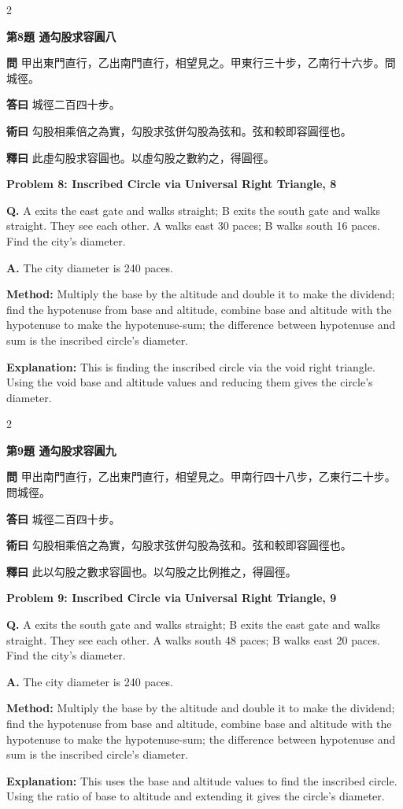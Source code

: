 \documentclass[11pt,a4paper]{article}
\newcommand{\wen}[1]{\noindent\textbf{問} #1\par\smallskip}
\newcommand{\da}[1]{\noindent\textbf{答曰} #1\par\smallskip}
\newcommand{\shu}[1]{\noindent\textbf{術曰} #1\par\smallskip}
\newcommand{\shi}[1]{\noindent\textbf{釋曰} #1\par\smallskip}
\newcommand{\wenE}[1]{\noindent\textbf{Q.} #1\par\smallskip}
\newcommand{\daE}[1]{\noindent\textbf{A.} #1\par\smallskip}
\newcommand{\shuE}[1]{\noindent\textbf{Method:} #1\par\smallskip}
\newcommand{\shiE}[1]{\noindent\textbf{Explanation:} #1\par\smallskip}
\begin{document}
\bigskip

\begin{paracol}{2}

\noindent\textbf{第8題 通勾股求容圓八}

\wen{甲出東門直行，乙出南門直行，相望見之。甲東行三十步，乙南行十六步。問城徑。}
\da{城徑二百四十步。}
\shu{勾股相乘倍之為實，勾股求弦併勾股為弦和。弦和較即容圓徑也。}
\shi{此虛勾股求容圓也。以虛勾股之數約之，得圓徑。}

\switchcolumn

\noindent\textbf{Problem 8: Inscribed Circle via Universal Right Triangle, 8}

\wenE{A exits the east gate and walks straight; B exits the south gate and walks straight. They see each other. A walks east 30 paces; B walks south 16 paces. Find the city's diameter.}
\daE{The city diameter is 240 paces.}
\shuE{Multiply the base by the altitude and double it to make the dividend; find the hypotenuse from base and altitude, combine base and altitude with the hypotenuse to make the hypotenuse-sum; the difference between hypotenuse and sum is the inscribed circle's diameter.}
\shiE{This is finding the inscribed circle via the void right triangle. Using the void base and altitude values and reducing them gives the circle's diameter.}

\end{paracol}

\bigskip

\begin{paracol}{2}

\noindent\textbf{第9題 通勾股求容圓九}

\wen{甲出南門直行，乙出東門直行，相望見之。甲南行四十八步，乙東行二十步。問城徑。}
\da{城徑二百四十步。}
\shu{勾股相乘倍之為實，勾股求弦併勾股為弦和。弦和較即容圓徑也。}
\shi{此以勾股之數求容圓也。以勾股之比例推之，得圓徑。}

\switchcolumn

\noindent\textbf{Problem 9: Inscribed Circle via Universal Right Triangle, 9}

\wenE{A exits the south gate and walks straight; B exits the east gate and walks straight. They see each other. A walks south 48 paces; B walks east 20 paces. Find the city's diameter.}
\daE{The city diameter is 240 paces.}
\shuE{Multiply the base by the altitude and double it to make the dividend; find the hypotenuse from base and altitude, combine base and altitude with the hypotenuse to make the hypotenuse-sum; the difference between hypotenuse and sum is the inscribed circle's diameter.}
\shiE{This uses the base and altitude values to find the inscribed circle. Using the ratio of base to altitude and extending it gives the circle's diameter.}

\end{paracol}
\end{document}
